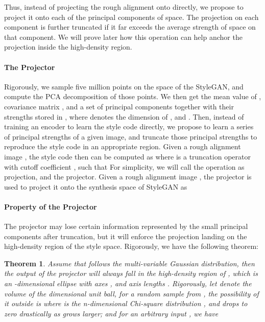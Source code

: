\documentclass[10pt,twocolumn,letterpaper]{article}
\begin{document}
Thus, instead of projecting the rough alignment onto  directly, we propose to project it onto each of the principal components of  space. The projection on each component is further truncated if it far exceeds the average strength of  space on that component. We will prove later how this operation can help anchor the projection inside the high-density region. 

\newcommand{\q}{\bm{q}}

\paragraph{The Projector} Rigorously, we sample five million points on the  space of the StyleGAN, and compute the PCA decomposition \cite{wold1987principal} of those points. We then get the mean value  of , covariance matrix , and a set of principal components  together with their strengths stored in , where  denotes the dimension of , and . Then, instead of training an encoder  to learn the style code directly, we propose to learn a series of principal strengths  of a given image, and truncate those principal strengths to reproduce the style code in an appropriate region. Given a rough alignment image , the style code  then can be computed as
where  is a truncation operator with cutoff coefficient , such that
For simplicity, we will call the operation
as projection, and  the projector. Given a rough alignment image , the projector  is used to project it onto the synthesis space of StyleGAN as 

\paragraph{Property of the Projector} The projector may lose certain information represented by the small principal components after truncation, but it will enforce the projection landing on the high-density region of the style space. Rigorously, we have the following theorem:
\newtheorem{theorem}{Theorem}
\begin{theorem}
Assume that  follows the multi-variable Gaussian distribution, then the output of the projector  will always fall in the high-density region of , which is an -dimensional ellipse  with axes , and axis lengths . Rigorously, let  denote the volume of the  dimensional unit ball, for a random sample  from , the possibility of it outside  is
where  is the n-dimensional Chi-square distribution \cite{lancaster2005chi}, and  drops to zero drastically as  grows larger; and for an arbitrary input , we have
\end{theorem}
\end{document}
